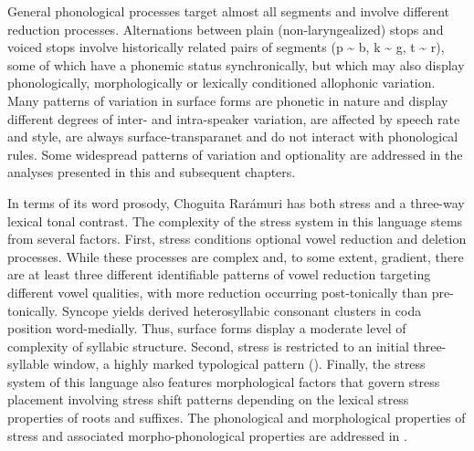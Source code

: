 General phonological processes target almost all segments and involve different reduction processes. Alternations between plain (non-laryngealized) stops and voiced stops involve historically related pairs of segments (p {\textasciitilde} b, k {\textasciitilde} g, t {\textasciitilde} r), some of which have a phonemic status synchronically, but which may also display phonologically, morphologically or lexically conditioned allophonic variation. Many patterns of variation in surface forms are phonetic in nature and display different degrees of inter- and intra-speaker variation, are affected by speech rate and style, are always surface-transparanet and do not interact with phonological rules. Some widespread patterns of variation and optionality are addressed in the analyses presented in this and subsequent chapters.

In terms of its word prosody, Choguita Rarámuri has both stress and a three-way lexical tonal contrast. The complexity of the stress system in this language stems from several factors. First, stress conditions optional vowel reduction and deletion processes. While these processes are complex and, to some extent, gradient, there are at least three different identifiable patterns of vowel reduction targeting different vowel qualities, with more reduction occurring post-tonically than pre-tonically. Syncope yields derived heterosyllabic consonant clusters in coda position word-medially. Thus, surface forms display a moderate level of complexity of syllabic structure. Second, stress is restricted to an initial three-syllable window, a highly marked typological pattern (\citealt{kager2012stress}). Finally, the stress system of this language also features morphological factors that govern stress placement involving stress shift patterns depending on the lexical stress properties of roots and suffixes. The phonological and morphological properties of stress and associated morpho-phonological properties are addressed in .

